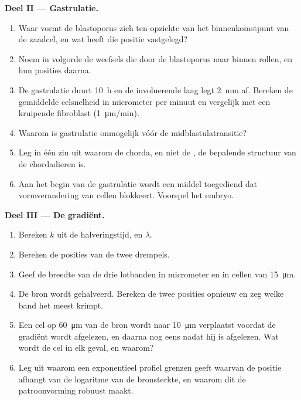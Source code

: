 \begin{problem}
\medskip
\noindent\textbf{Deel II --- Gastrulatie.}
\begin{enumerate}[resume]
  \item Waar vormt de blastoporus zich ten opzichte van het binnenkomstpunt
        van de zaadcel, en wat heeft die positie vastgelegd?
  \item Noem in volgorde de weefsels die door de blastoporus naar binnen
        rollen, en hun posities daarna.
  \item De gastrulatie duurt \qty{10}{h} en de involuerende laag legt
        \qty{2}{mm} af. Bereken de gemiddelde celsnelheid in micrometer per
        minuut en vergelijk met een kruipende fibroblast
        (\qty{1}{\micro m/min}).
  \item Waarom is gastrulatie onmogelijk vóór de midblastulatransitie?
  \item Leg in één zin uit waarom de chorda, en niet de , de
        bepalende structuur van de chordadieren is.
  \item Aan het begin van de gastrulatie wordt een middel toegediend dat
        vormverandering van cellen blokkeert. Voorspel het embryo.
\end{enumerate}

\medskip
\noindent\textbf{Deel III --- De gradiënt.}
\begin{enumerate}[resume]
  \item Bereken $k$ uit de halveringstijd, en $\lambda$.
  \item Bereken de posities van de twee drempels.
  \item Geef de breedte van de drie lotbanden in micrometer en in cellen van
        \qty{15}{\micro m}.
  \item De bron wordt gehalveerd. Bereken de twee posities opnieuw en zeg
        welke band het meest krimpt.
  \item Een cel op \qty{60}{\micro m} van de bron wordt naar
        \qty{10}{\micro m} verplaatst voordat de gradiënt wordt afgelezen, en
        daarna nog eens nadat hij is afgelezen. Wat wordt de cel in elk geval,
        en waarom?
  \item Leg uit waarom een exponentieel profiel grenzen geeft waarvan de
        positie afhangt van de logaritme van de bronsterkte, en waarom dit
        de patroonvorming robuust maakt.
\end{enumerate}


\end{problem}
